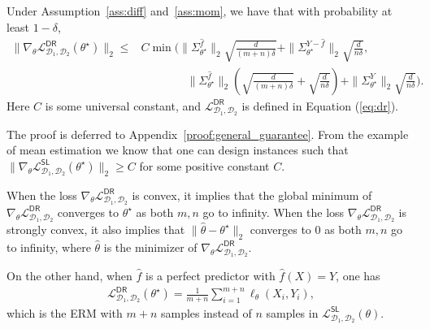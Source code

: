 \begin{theorem}\label{thm:general} Under Assumption~\ref{ass:diff} and~\ref{ass:mom}, we have that with probability at least $1-\delta$,
\begin{align*}
  \| \nabla_\theta \mathcal{L}^{\mathsf{DR}}_{\mathcal{D}_1,\mathcal{D}_2}(\theta^\star) \|_2 \leq & C   \min\Bigg(\|\Sigma_{\theta^\star}^{\hat f}\|_2\sqrt{\frac{d}{(m+n) \delta}} + \|\Sigma_{\theta^\star}^{Y-\hat f}\|_2\sqrt{\frac{d}{n \delta}},  \\ 
  &  \qquad \qquad \|\Sigma_{\theta^\star}^{\hat f}\|_2\left(\sqrt{\frac{d}{(m+n) \delta}} + \sqrt{\frac{d}{n\delta}} \right) + \|\Sigma_{\theta^\star}^{Y}\|_2\sqrt{\frac{d}{n \delta}}\Bigg).
\end{align*} 
Here $C$ is some universal constant, and $\mathcal{L}^{\mathsf{DR}}_{\mathcal{D}_1,\mathcal{D}_2}$ is defined in Equation (\ref{eq:dr}).
\end{theorem}

The proof is deferred to Appendix~\ref{proof:general_guarantee}. From the example of mean estimation we know that one can design instances such that $   \| \nabla_\theta \mathcal{L}^{\mathsf{SL}}_{\mathcal{D}_1,\mathcal{D}_2}(\theta^\star) \|_2  \geq C$ for some positive constant $C$. 

When the loss $\nabla_\theta \mathcal{L}^{\mathsf{DR}}_{\mathcal{D}_1,\mathcal{D}_2}$ is convex, it implies that the global minimum of $\nabla_\theta \mathcal{L}^{\mathsf{DR}}_{\mathcal{D}_1,\mathcal{D}_2}$ converges to $\theta^\star$ as both $m, n$ go to infinity. When the loss $\nabla_\theta \mathcal{L}^{\mathsf{DR}}_{\mathcal{D}_1,\mathcal{D}_2}$ is strongly convex, it also implies that  $\|\hat \theta-\theta^\star\|_2$ converges to  $0$  as both $m, n$ go to infinity, where $\hat \theta$ is the minimizer of $\nabla_\theta \mathcal{L}^{\mathsf{DR}}_{\mathcal{D}_1,\mathcal{D}_2}$.

On the other hand, when $\hat f$ is a perfect predictor with $\hat f(X) = Y$, one has 
\begin{align*}
\mathcal{L}^{\mathsf{DR}}_{\mathcal{D}_1,\mathcal{D}_2}(\theta^\star) = \frac{1}{m+n}  \sum_{i=1}^{m+n} \ell_\theta(X_i, Y_i),
\end{align*}
which is the ERM with $m+n$ samples instead of $n$ samples in $\mathcal{L}^{\mathsf{SL}}_{\mathcal{D}_1,\mathcal{D}_2}(\theta)$.


